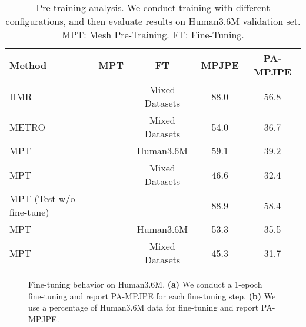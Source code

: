 \begin{table}[t]
\centering
\begin{tabular}{lcccc}
    \toprule[1.5pt]
	Method  & MPT & FT & MPJPE  & PA-MPJPE  \\
	\midrule
	HMR~\cite{kanazawa2018end} & \xmark & Mixed Datasets & 88.0 & 56.8\\
	METRO~\cite{lin2020end} & \xmark & Mixed Datasets & 54.0 & 36.7\\
	\midrule
	MPT  & \xmark & Human3.6M & 59.1 & 39.2\\
	MPT  & \xmark & Mixed Datasets & 46.6 & 32.4\\
	\midrule
	MPT (Test w/o fine-tune) & \cmark & \xmark & 88.9 & 58.4\\
	MPT  & \cmark & Human3.6M & 53.3 & 35.5\\
	MPT  & \cmark & Mixed Datasets & 45.3 & 31.7\\
	\bottomrule[1.5pt]
\end{tabular}
\caption{Pre-training analysis. We conduct training with different configurations, and then evaluate results on Human3.6M validation set. MPT: Mesh Pre-Training. FT: Fine-Tuning.}
\label{tbl:pretrain-analysis}
\vspace{-4mm}
\end{table}
 \begin{figure}[t]
\vspace{-2mm}
\centering
\caption{
Fine-tuning behavior on Human3.6M. \textbf{(a)} We conduct a 1-epoch fine-tuning and report PA-MPJPE for each fine-tuning step. \textbf{(b)} We use a percentage of Human3.6M data for fine-tuning and report PA-MPJPE. }
\vspace{-4mm}
\end{figure}

